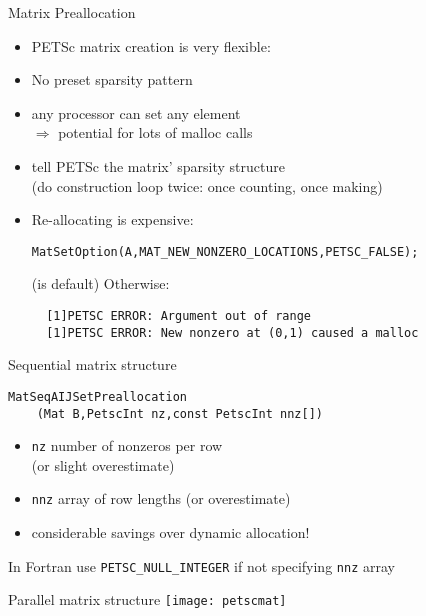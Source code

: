 \begin{numberedframe}{Matrix Preallocation}

  \begin{itemize}
  \item PETSc matrix creation is very flexible:
  \item No preset sparsity pattern
  \item any processor can set any element\\
    $\Rightarrow$ potential for lots of malloc calls
  \item tell PETSc the matrix' sparsity structure\\ (do construction
    loop twice: once counting, once making)
  \item Re-allocating is expensive:
\begin{lstlisting}
MatSetOption(A,MAT_NEW_NONZERO_LOCATIONS,PETSC_FALSE);
\end{lstlisting}
  (is default) Otherwise:
\begin{verbatim}
  [1]PETSC ERROR: Argument out of range
  [1]PETSC ERROR: New nonzero at (0,1) caused a malloc
\end{verbatim}
  \end{itemize}

\end{numberedframe}

\begin{numberedframe}{Sequential matrix  structure}
\begin{lstlisting}
MatSeqAIJSetPreallocation
    (Mat B,PetscInt nz,const PetscInt nnz[])
\end{lstlisting}
  \begin{itemize}
  \item \lstinline{nz} number of nonzeros per row\\ (or slight overestimate)
  \item \lstinline{nnz} array of row lengths (or overestimate)
  \item considerable savings over dynamic allocation!
  \end{itemize}
In Fortran use \lstinline{PETSC_NULL_INTEGER} if not specifying \lstinline{nnz} array
\end{numberedframe}

\begin{numberedframe}{Parallel matrix structure}
\texttt{[image: petscmat]}
\end{numberedframe}

